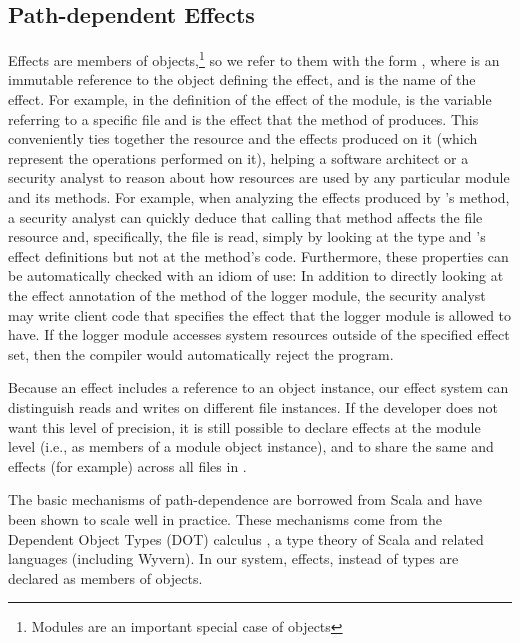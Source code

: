 \subsection{Path-dependent Effects}

Effects are members of objects,\footnote{Modules are an important special case of objects} so we refer to them with the form , where  is an immutable reference to the object defining the effect, and  is the name of the effect. For example, in the definition of the  effect of the  module,  is the variable referring to a specific file and  is the effect that the  method of  produces. This conveniently ties together the resource and the effects produced on it (which represent the operations performed on it), helping a software architect or a security analyst to reason about how resources are used by any particular module and its methods. For example, when analyzing the effects produced by 's  method, a security analyst can quickly deduce that calling that method affects the file resource and, specifically, the file is read, simply by looking at the  type and 's effect definitions but not at the method's code. Furthermore, these properties can be automatically checked with an idiom of use: In addition to directly looking at the effect annotation of the method of the logger module, the security analyst may write client code that specifies the effect that the logger module is allowed to have. If the logger module accesses system resources outside of the specified effect set, then the compiler would automatically reject the program.

Because an effect includes a reference to an object instance, our effect system can distinguish reads and writes on different file instances. If the developer does not want this level of precision, it is still possible to declare effects at the module level (i.e., as members of a  module object instance), and to share the same  and  effects (for example) across all files in .

The basic mechanisms of path-dependence are borrowed from Scala and have been shown to scale well in practice. These mechanisms come from the Dependent Object Types (DOT) calculus \cite{amin14}, a type theory of Scala and related languages (including Wyvern). In our system, effects, instead of types are declared as members of objects.

